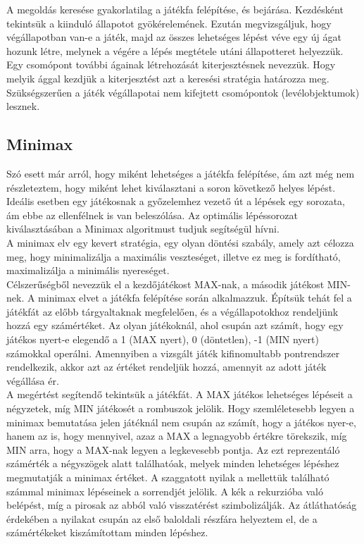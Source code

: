 A megoldás keresése gyakorlatilag a játékfa felépítése, és bejárása. Kezdésként tekintsük a kiinduló állapotot gyökérelemének. Ezután  megvizsgáljuk, hogy végállapotban van-e a játék, majd az összes lehetséges lépést véve egy új ágat hozunk létre, melynek a végére a lépés megtétele utáni állapotteret helyezzük. Egy csomópont további ágainak létrehozását kiterjesztésnek nevezzük. Hogy melyik ággal kezdjük a kiterjesztést azt a keresési stratégia határozza meg. Szükségszerűen a játék végállapotai nem kifejtett csomópontok (levélobjektumok) lesznek.\\

\subsection{Minimax}
Szó esett már arról, hogy miként lehetséges a játékfa felépítése, ám azt még nem részleteztem, hogy miként lehet kiválasztani a soron következő helyes lépést. Ideális esetben egy játékosnak a győzelemhez vezető út a lépések egy sorozata, ám ebbe az ellenfélnek is van beleszólása. Az optimális lépéssorozat kiválasztásában a Minimax algoritmust tudjuk segítségül hívni.\\

A minimax elv egy kevert stratégia, egy olyan döntési szabály, amely azt célozza meg, hogy minimalizálja a maximális veszteséget, illetve ez meg is fordítható, maximalizálja a minimális nyereséget. \\

Célszerűségből nevezzük el a kezdőjátékost MAX-nak, a második játékost MIN-nek. A minimax elvet a játékfa felépítése során alkalmazzuk. Építsük tehát fel a játékfát az előbb tárgyaltaknak megfelelően, és a végállapotokhoz rendeljünk hozzá egy számértéket. Az olyan játékoknál, ahol csupán azt számít, hogy egy játékos nyert-e elegendő a 1 (MAX nyert), 0 (döntetlen), -1 (MIN nyert) számokkal operálni. Amennyiben a vizsgált játék kifinomultabb pontrendszer rendelkezik, akkor azt az értéket rendeljük hozzá, amennyit az adott játék végállása ér.\\


A megértést segítendő tekintsük a  játékfát. A MAX játékos lehetséges lépéseit a négyzetek, míg MIN játékosét a rombuszok jelölik. Hogy szemléletesebb legyen a minimax bemutatása jelen játéknál nem csupán az számít, hogy a játékos nyer-e, hanem az is, hogy mennyivel, azaz a MAX a legnagyobb értékre törekszik, míg MIN arra, hogy a MAX-nak legyen a legkevesebb pontja. Az ezt reprezentáló számérték a négyszögek alatt találhatóak, melyek minden lehetséges lépéshez megmutatják a minimax értéket. A szaggatott nyilak a mellettük található számmal minimax lépéseinek a sorrendjét jelölik. A kék a rekurzióba való belépést, míg a pirosak az abból való visszatérést szimbolizálják. Az átláthatóság érdekében a nyilakat csupán az első baloldali részfára helyeztem el, de a számértékeket kiszámítottam minden lépéshez. \\

